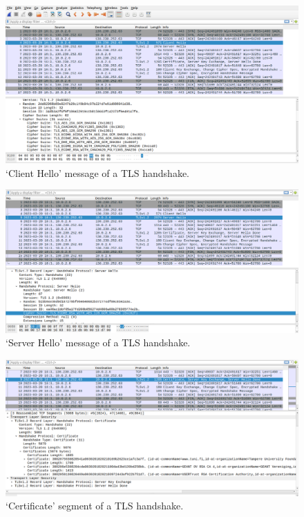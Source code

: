 \begin{figure}
    \centering
    \includegraphics[height=\textheight,width=\textwidth,keepaspectratio]
    {figures/client_hello.png}
    \caption{`Client Hello' message of a TLS handshake.}
    \label{fig:client_hello_handshake}
\end{figure}

\begin{figure}
    \centering
    \includegraphics[height=\textheight,width=\textwidth,keepaspectratio]
    {figures/server_hello.png}
    \caption{`Server Hello' message of a TLS handshake.}
    \label{fig:server_hello_handshake}
\end{figure}

\begin{figure}
    \centering
    \includegraphics[height=\textheight,width=\textwidth,keepaspectratio]
    {figures/certificate_tls.png}
    \caption{`Certificate' segment of a TLS handshake.}
    \label{fig:cert_tls}
\end{figure}

